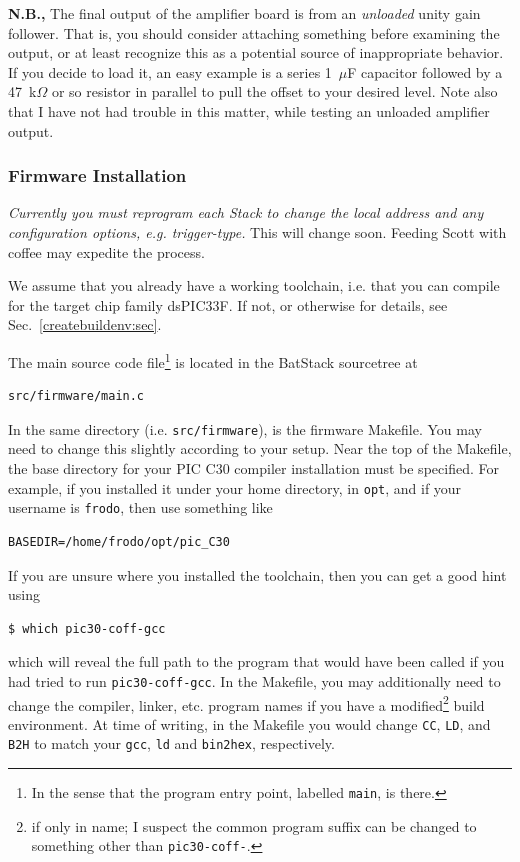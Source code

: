 \documentclass[letterpaper]{article}
\begin{document}
\textbf{N.B.,} The final output of the amplifier board is from an
\textit{unloaded} unity gain follower. That is, you should consider
attaching something before examining the output, or at least recognize
this as a potential source of inappropriate behavior. If you decide to
load it, an easy example is a series 1~$\mu$F capacitor followed by a
47~k$\Omega$ or so resistor in parallel to pull the offset to your
desired level. Note also that I have not had trouble in this matter,
while testing an unloaded amplifier output.

\subsubsection{Firmware Installation}

\textit{Currently you must reprogram each Stack to change the local
  address and any configuration options, e.g. trigger-type.} This will
change soon. Feeding Scott with coffee may expedite the process.

We assume that you already have a working toolchain, i.e. that you can
compile for the target chip family dsPIC33F. If not, or otherwise for
details, see Sec.~\ref{createbuildenv:sec}.

The main source code file\footnote{In the sense that the program entry
  point, labelled \texttt{main}, is there.} is located in the BatStack
sourcetree at
\begin{verbatim}
src/firmware/main.c
\end{verbatim}
In the same directory (i.e. \texttt{src/firmware}), is the firmware
Makefile. You may need to change this slightly according to your
setup. Near the top of the Makefile, the base directory for your PIC
C30 compiler installation must be specified. For example, if you
installed it under your home directory, in \texttt{opt}, and if your
username is \texttt{frodo}, then use something like
\begin{verbatim}
BASEDIR=/home/frodo/opt/pic_C30
\end{verbatim}
If you are unsure where you installed the toolchain, then you can get
a good hint using
\begin{verbatim}
$ which pic30-coff-gcc
\end{verbatim}
which will reveal the full path to the program that would have been
called if you had tried to run \texttt{pic30-coff-gcc}. In the
Makefile, you may additionally need to change the compiler, linker,
etc. program names if you have a modified\footnote{if only in name; I
  suspect the common program suffix can be changed to something other
  than \texttt{pic30-coff-}.} build environment. At time of writing,
in the Makefile you would change \texttt{CC}, \texttt{LD}, and
\texttt{B2H} to match your \texttt{gcc}, \texttt{ld} and
\texttt{bin2hex}, respectively.
\end{document}
